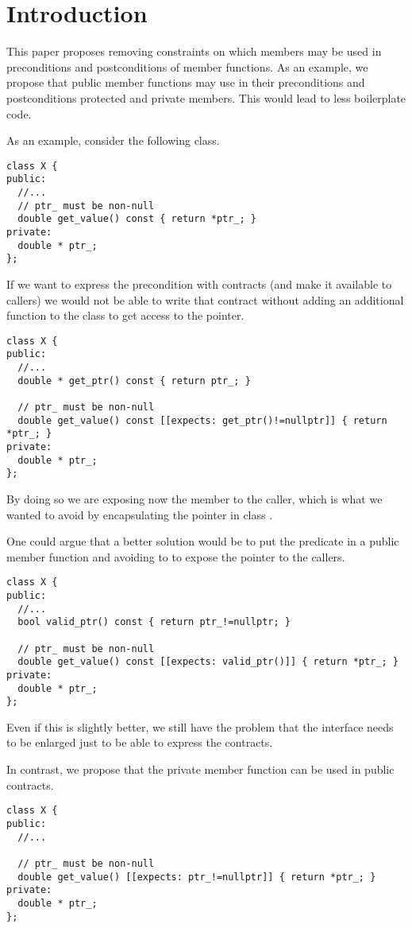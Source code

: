 \section{Introduction}

This paper proposes removing constraints on which members may be used in
preconditions and postconditions of member functions. As an example, we propose
that public member functions may use in their preconditions and postconditions
protected and private members. This would lead to less boilerplate code.

As an example, consider the following class.

\begin{lstlisting}
class X {
public:
  //...
  // ptr_ must be non-null
  double get_value() const { return *ptr_; }
private:
  double * ptr_; 
};
\end{lstlisting}

If we want to express the precondition with contracts (and make it available to
callers) we would not be able to write that contract without adding an
additional function to the class to get access to the pointer.

\begin{lstlisting}
class X {
public:
  //...
  double * get_ptr() const { return ptr_; }

  // ptr_ must be non-null
  double get_value() const [[expects: get_ptr()!=nullptr]] { return *ptr_; }
private:
  double * ptr_; 
};
\end{lstlisting}

By doing so we are exposing now the  member to the caller, which is what we
wanted to avoid by encapsulating the pointer in class .

One could argue that a better solution would be to put the predicate in a public
member function and avoiding to to expose the pointer to the callers.

\begin{lstlisting}
class X {
public:
  //...
  bool valid_ptr() const { return ptr_!=nullptr; }

  // ptr_ must be non-null
  double get_value() const [[expects: valid_ptr()]] { return *ptr_; }
private:
  double * ptr_; 
};
\end{lstlisting}

Even if this is slightly better, we still have the problem that the interface
needs to be enlarged just to be able to express the contracts.

In contrast, we propose that the private member function can be used in public
contracts.

\begin{lstlisting}
class X {
public:
  //...

  // ptr_ must be non-null
  double get_value() [[expects: ptr_!=nullptr]] { return *ptr_; }
private:
  double * ptr_; 
};
\end{lstlisting}

